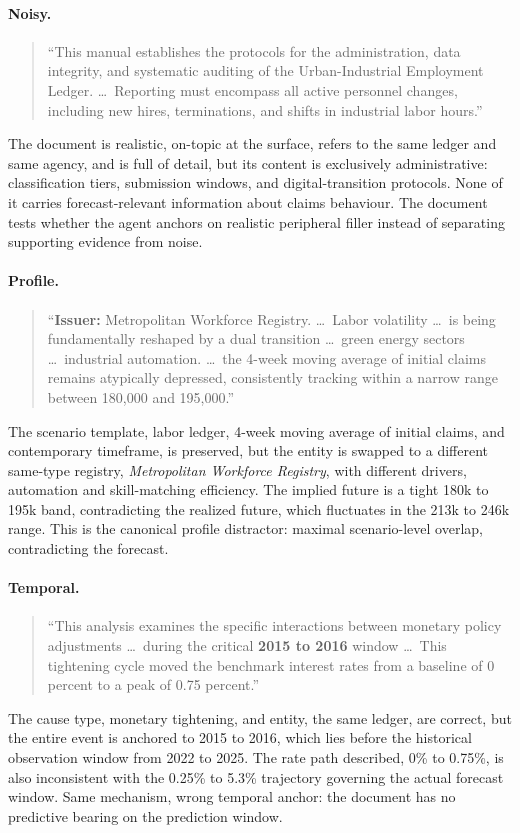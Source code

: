 \documentclass[]{servicenow}
\begin{document}
\paragraph{Noisy.}
\begin{quote}\small
``This manual establishes the protocols for the administration, data integrity, and systematic auditing of the Urban-Industrial Employment Ledger. \ldots\ Reporting must encompass all active personnel changes, including new hires, terminations, and shifts in industrial labor hours.''
\end{quote}
The document is realistic, on-topic at the surface, refers to the same ledger and same agency, and is full of detail, but its content is exclusively administrative: classification tiers, submission windows, and digital-transition protocols. None of it carries forecast-relevant information about claims behaviour. The document tests whether the agent anchors on realistic peripheral filler instead of separating supporting evidence from noise.

\paragraph{Profile.}
\begin{quote}\small
``\textbf{Issuer:} Metropolitan Workforce Registry. \ldots\ Labor volatility \ldots\ is being fundamentally reshaped by a dual transition \ldots\ green energy sectors \ldots\ industrial automation. \ldots\ the 4-week moving average of initial claims remains atypically depressed, consistently tracking within a narrow range between 180,000 and 195,000.''
\end{quote}
The scenario template, labor ledger, 4-week moving average of initial claims, and contemporary timeframe, is preserved, but the entity is swapped to a different same-type registry, \textit{Metropolitan Workforce Registry}, with different drivers, automation and skill-matching efficiency. The implied future is a tight 180k to 195k band, contradicting the realized future, which fluctuates in the 213k to 246k range. This is the canonical profile distractor: maximal scenario-level overlap, contradicting the forecast.



\paragraph{Temporal.}
\begin{quote}\small
``This analysis examines the specific interactions between monetary policy adjustments \ldots\ during the critical \textbf{2015 to 2016} window \ldots\ This tightening cycle moved the benchmark interest rates from a baseline of 0 percent to a peak of 0.75 percent.''
\end{quote}
The cause type, monetary tightening, and entity, the same ledger, are correct, but the entire event is anchored to 2015 to 2016, which lies before the historical observation window from 2022 to 2025. The rate path described, 0\% to 0.75\%, is also inconsistent with the 0.25\% to 5.3\% trajectory governing the actual forecast window. Same mechanism, wrong temporal anchor: the document has no predictive bearing on the prediction window.
\end{document}
